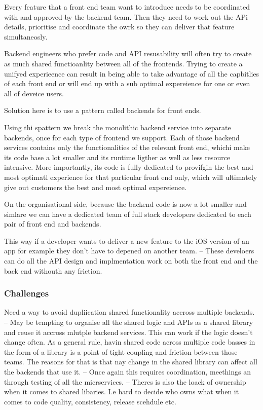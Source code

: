 \documentclass[a4paper, 11pt]{book}
\begin{document}
    Every feature that a front end team want to introduce needs to be coordinated with and approved by the backend team.
    Then they need to work out the APi details, prioritise and coordinate the owrk so they can deliver that feature simultaneosly.

    Backend engineers who prefer code and API resusability will often try to create as much shared functioanlity between all of the frontends.
    Trying to create a unifyed experieence can result in being able to take advantage of all the capbitlies of each front end or will end up with a sub optimal expereience for one or even all of deveice users.

    Solution here is to use a pattern called backends for front ends.

    Using thi spattern we break the monolithic backend service into separate backends, once for each type of frontend we support.
    Each of those backend services contains only the functionalities of the relevant front end, whichi make its code base a lot smaller and its runtime ligther as well as less resource intensive.
    More importantly, its code is fully dedicated to provifgin the best and most optimatl experience for that particular front end only, which will ultimately give out customers the best and most optimal expereience.

    On the organisational side, because the backend code is now a lot smaller and simlare we can have a dedicated team of full stack developers dedicated to each pair of front end and backends.

    This way if a developer wants to deliver a new feature to the iOS version of an app for example they don't have to depened on another team.
    -- These develoers can do all the API design and implmentation work on both the front end and the back end withouth any friction.

    \subsubsection{Challenges}
    Need a way to avoid dupliication shared functionality accross multiple backends.
    -- May be tempting to organise all the shared logic and APIs as a shared library and reuse it accross mlutple backend services. This can work if the logic doesn't change often.
    As a general rule, havin shared code across multiple code basses in the form of a library is a point of tight coupling and friction between those teams.
    The reasons for that is that nay change in the shared library can affect all the backends that use it.
    -- Once again this requires coordination, meethings an through testing of all the micrservices.
    -- Theres is also the loack of ownership when it comes to shared libaries. I.e hard to decide who owns what when it comes to code quality, consistency, release scehdule etc.
\end{document}
